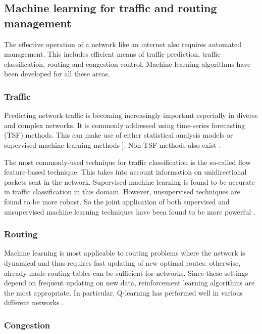 \documentclass[twocolumn, aps, rmp, amsmath, amssymb, nofootinbib, superscriptaddress, longbibliography, floatfix, table-of-contents, eqsecnum]{revtex4-2}
\begin{document}
\subsection{Machine learning for traffic and routing management}
The effective operation of a network like an internet also requires automated management. This includes efficient means of traffic prediction, traffic classification, routing and congestion control. Machine learning algorithms have been developed for all these areas.

\subsubsection{Traffic}

Predicting network traffic is becoming increasingly important especially in diverse and complex networks. It is commonly addressed using time-series forecasting (TSF) methods. This can make use of either statistical analysis models or supervised machine learning methods \cite{bermolen2009support, chabaa2010identification, cortez2006internet}]. Non-TSF methods also exist \cite{chen2016predicting, li2016inter}.

The most commonly-used technique for traffic classification is the so-called flow feature-based
technique. This takes into account information on unidirectional packets sent in the network. Supervised machine learning is found to be accurate in traffic classification in this domain. However, unsupervised techniques are found to be more robust. So the joint application of both supervised and unsupervised machine learning techniques have been found to be more powerful \cite{erman2007offline, zhang2015robust}.

\subsubsection{Routing}

Machine learning is most applicable to routing problems where the network is dynamical and thus requires fast updating of new optimal routes. otherwise, already-made routing tables can be sufficient for networks. Since these settings depend on frequent updating on new data, reinforcement learning algorithms are the most appropriate. In particular, Q-learning has performed well in various different networks \cite{wang2006adaptive, forster2007froms, arroyo2007q}.

\subsubsection{Congestion}
\end{document}
